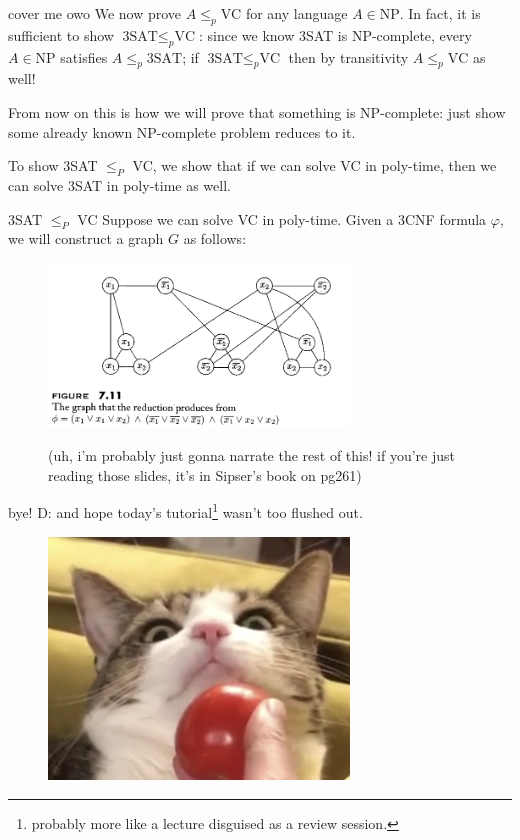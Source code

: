 \documentclass{beamer}
\begin{document}
\begin{frame}{cover me owo \emojiflushed}
We now prove $A \leq_p \text{VC}$ for any language $A \in \text{NP}$. In fact, it is sufficient to show $\text{3SAT} \leq_p \text{VC}$: since we know 3SAT is NP-complete, every $A \in \text{NP}$ satisfies $A \leq_p \text{3SAT}$; if $\text{3SAT} \leq_p \text{VC}$ then by transitivity $A \leq_p \text{VC}$ as well!

\vspace{2mm}

From now on this is how we will prove that something is NP-complete: just show some already known NP-complete problem reduces to it.

\vspace{2mm}

To show 3SAT $\leq_P$ VC, we show that if we can solve VC in poly-time, then we can solve 3SAT in poly-time as well.
\end{frame}

\begin{frame}{3SAT $\leq_P$ VC \emojiflushed}
Suppose we can solve VC in poly-time. Given a 3CNF formula $\varphi$, we will construct a graph $G$ as follows:

\begin{figure}[h]
\centering
\includegraphics[width=8cm]{img/book_example.png}


(uh, i'm probably just gonna narrate the rest of this! if you're just reading those slides, it's in Sipser's book on pg261)
\end{figure}


\end{frame}

\begin{frame}{\emojimoyai}

bye! D: and hope today's tutorial\footnote{probably more like a lecture disguised as a review session.} wasn't too flushed out.

\begin{figure}[h]
\centering
\includegraphics[width=8cm]{img/not_floppa.png}
\end{figure}

\end{frame}
\end{document}
